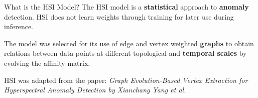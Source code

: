 \begin{frame}{What is the HSI Model?}
    The HSI model is a \textbf{statistical} approach to \textbf{anomaly} detection.  HSI does not learn weights through training for later use during inference. 

    \hfill
    
    The model was selected for its use of edge and vertex weighted \textbf{graphs} to obtain relations between data points at different topological and \textbf{temporal scales} by evolving the affinity matrix. 

    \hfill   
    
    HSI was adapted from the paper: \textit{Graph Evolution-Based Vertex Extraction for Hyperspectral Anomaly Detection by Xianchang Yang et al.}
    \hfill
\end{frame}




    
    
